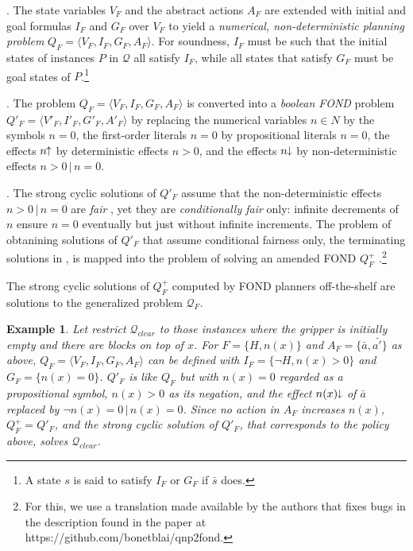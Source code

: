 \documentclass[letterpaper]{article} %
\newcommand{\tup}[1]{\langle #1 \rangle}
\newtheorem{example}[definition]{Example}
\newcommand{\Q}{\mathcal{Q}}
\newcommand{\pplus}{\hspace{-.05em}\raisebox{.15ex}{\footnotesize$\uparrow$}}
\newcommand{\mminus}{\hspace{-.05em}\raisebox{.15ex}{\footnotesize$\downarrow$}}
\begin{document}
\medskip

. The state variables $V_F$ and the abstract actions $A_F$ are extended
  with initial and goal  formulas $I_F$ and $G_F$  over $V_F$ to yield a   \emph{numerical, non-deterministic planning problem}
  $Q_F=\tup{V_F,I_F,G_F,A_F}$. For soundness,  $I_F$ must be  such that the initial states of instances $P$ in $\Q$ all satisfy $I_F$,
  while all states that satisfy $G_F$ must be goal states of $P$.\footnote{
   A state $s$ is said to satisfy $I_F$ or $G_F$ if  $\bar{s}$ does.}

  
\medskip

. The problem $Q_F=\tup{V_F,I_F,G_F,A_F}$ is converted into a \emph{boolean FOND}
  problem $Q'_F=\tup{V'_F,I'_F,G'_F,A'_F}$ by replacing 
  the numerical variables $n\in N$ by the symbols $n=0$, the first-order literals $n=0$ by propositional literals  $n=0$, 
  the effects $n\pplus$ by deterministic effects $n > 0$, and the effects $n\mminus$ by non-deterministic effects $n>0\,|\,n=0$.

  \medskip
  
. The strong cyclic solutions of  $Q'_F$ assume that the
  non-deterministic effects $n>0\,|\,n=0$ are \emph{fair} \cite{strong-cyclic},  
  yet  they are  \emph{conditionally fair} only: infinite decrements of $n$ ensure $n=0$  eventually but just without
  infinite  increments. The problem of obtanining  solutions of $Q'_F$ that assume conditional fairness only, the  terminating
  solutions in   \cite{srivastava:aaai2011}, is mapped into the problem of solving an  amended FOND $Q^+_F$
  \cite{bonet:ijcai2017}.\footnote{For this, we use a translation made available by the authors that fixes bugs in the  description found in the paper
     at https://github.com/bonetblai/qnp2fond.}

\medskip

The strong cyclic solutions of  $Q^+_F$ computed by FOND planners off-the-shelf   are solutions to the generalized problem $\Q_F$. 

\begin{example}
  Let restrict  $\Q_{clear}$  to those  instances where  the gripper is initially empty
  and there are blocks on top of $x$. For $F=\{H,n(x)\}$  and $A_F=\{\bar{a},\bar{a'}\}$ as above, 
   $Q_F=\tup{V_F,I_F,G_F,A_F}$ can be defined with $I_F=\{\neg H, n(x) > 0\}$ and $G_F=\{n(x)=0\}$.
   $Q'_F$ is like $Q_F$ but with $n(x)=0$ regarded as a propositional symbol, $n(x) > 0$
  as its negation, and the effect $n(x)\mminus$ of  $\bar{a}$ replaced by  $\neg n(x)=0 \, | \, n(x)=0$.
  Since  no action in $A_F$  increases $n(x)$,   $Q^+_F=Q'_F$, and the strong cyclic solution  of $Q'_F$,
  that corresponds to the policy above, solves $\Q_{clear}$.
\end{example}
\end{document}

